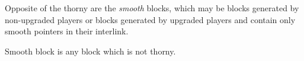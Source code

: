 Opposite of the thorny are the \emph{smooth} blocks, which may be blocks generated by non-upgraded players or blocks generated by upgraded players and contain only smooth pointers in their interlink.

\begin{definition}
	Smooth block is any block which is not thorny.
	\label{defn:smooth_block}
\end{definition}
